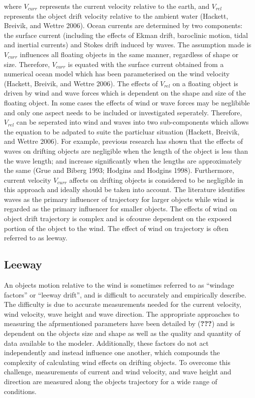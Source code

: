 \documentclass[
]{article}
\begin{document}
where \(V_{curr}\) represents the current velocity relative to the
earth, and \(V_{rel}\) represents the object drift velocity relative to
the ambient water (Hackett, Breivik, and Wettre 2006). Ocean currents
are determined by two components: the surface current (including the
effects of Ekman drift, baroclinic motion, tidal and inertial currents)
and Stokes drift induced by waves. The assumption made is \(V_{curr}\)
influences all floating objects in the same manner, regardless of shape
or size. Therefore, \(V_{curr}\) is equated with the surface current
obtained from a numerical ocean model which has been parameterised on
the wind velocity (Hackett, Breivik, and Wettre 2006). The effects of
\(V_{rel}\) on a floating object is driven by wind and wave forces which
is dependent on the shape and size of the floating object. In some cases
the effects of wind or wave forces may be neglibible and only one aspect
needs to be included or investigated seperately. Therefore, \(V_{rel}\)
can be seperated into wind and waves into two sub-components which
allows the equation to be adpated to suite the particluar situation
(Hackett, Breivik, and Wettre 2006). For example, previous research has
shown that the effects of waves on drifting objects are negligible when
the length of the object is less than the wave length; and increase
significantly when the lengths are approximately the same (Grue and
Biberg 1993; Hodgins and Hodgins 1998). Furthermore, current velocity
\(V_{curr}\) affects on drifting objects is considered to be negligible
in this approach and ideally should be taken into account. The
literature identifies waves as the primary influencer of trajectory for
larger objects while wind is regarded as the primary influencer for
smaller objects. The effects of wind on object drift trajectory is
complex and is ofcourse dependent on the exposed portion of the object
to the wind. The effect of wind on trajectory is often referred to as
leeway.

\hypertarget{leeway}{%
\subsection{Leeway}\label{leeway}}

An objects motion relative to the wind is sometimes referred to as
``windage factors'' or ``leeway drift'', and is difficult to accurately
and empirically describe. The difficulty is due to accurate measurements
needed for the current velocity, wind velocity, wave height and wave
direction. The appropriate approaches to measuring the afprmentioned
parameters have been detailed by ({\textbf{???}}) and is dependent on
the objects size and shape as well as the quality and quantity of data
available to the modeler. Additionally, these factors do not act
independently and instead influence one another, which compounds the
complexity of calculating wind effects on drifting objects. To overcome
this challenge, measurements of current and wind velocity, and wave
height and direction are measured along the objects trajectory for a
wide range of conditions.
\end{document}
